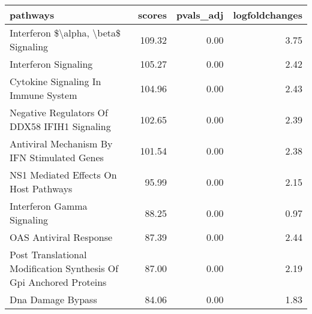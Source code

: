 \begin{tabular}{lrrr}
\toprule
pathways & scores & pvals\_adj & logfoldchanges \\
\midrule
Interferon \$\textbackslash alpha, \textbackslash beta\$ Signaling & 109.32 & 0.00 & 3.75 \\
Interferon Signaling & 105.27 & 0.00 & 2.42 \\
Cytokine Signaling In Immune System & 104.96 & 0.00 & 2.43 \\
Negative Regulators Of DDX58 IFIH1  Signaling & 102.65 & 0.00 & 2.39 \\
Antiviral Mechanism By IFN Stimulated Genes & 101.54 & 0.00 & 2.38 \\
NS1 Mediated Effects On Host Pathways & 95.99 & 0.00 & 2.15 \\
Interferon Gamma Signaling & 88.25 & 0.00 & 0.97 \\
OAS Antiviral Response & 87.39 & 0.00 & 2.44 \\
Post Translational Modification Synthesis Of Gpi Anchored Proteins & 87.00 & 0.00 & 2.19 \\
Dna Damage Bypass & 84.06 & 0.00 & 1.83 \\
\bottomrule
\end{tabular}
